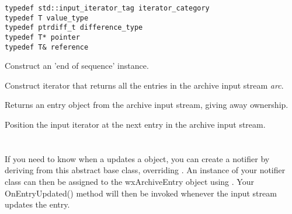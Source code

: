 \begin{verbatim}
typedef std::input_iterator_tag iterator_category
typedef T value_type
typedef ptrdiff_t difference_type
typedef T* pointer
typedef T& reference
\end{verbatim}



\label{wxarchiveiteratorwxarchiveiterator}


Construct an 'end of sequence' instance.


Construct iterator that returns all the entries in the archive input
stream {\it arc}.


\label{wxarchiveiteratoroperatorstar}


Returns an entry object from the archive input stream, giving away
ownership.


\label{wxarchiveiteratoroperatorincrement}



Position the input iterator at the next entry in the archive input stream.


%
%

\section{}\label{wxarchivenotifier}

If you need to know when a
  updates a
  object, you can create
a notifier by deriving from this abstract base class, overriding
 .  An instance
of your notifier class can then be assigned to the wxArchiveEntry object
using .
Your OnEntryUpdated() method will then be invoked whenever the input
stream updates the entry.


